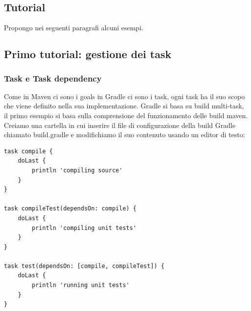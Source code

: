 \documentclass{article}
\begin{document}
\begin{flushleft}
\section{Tutorial} %
Propongo nei seguenti paragrafi alcuni esempi.

\subsection{Primo tutorial: gestione dei task}

\subsubsection{Task e Task dependency}
Come in Maven ci sono i goals in Gradle ci sono i task, ogni task ha il suo scopo che viene definito nella sua implementazione. Gradle si basa su build multi-task, il primo esempio si basa sulla comprensione del funzionamento delle build maven. Creiamo una cartella in cui inserire il file di configurazione della build Gradle chiamato build.gradle e modifichiamo il suo contenuto usando un editor di testo:
\begin{verbatim}
task compile {
    doLast {
        println 'compiling source'
    }
}

task compileTest(dependsOn: compile) {
    doLast {
        println 'compiling unit tests'
    }
}

task test(dependsOn: [compile, compileTest]) {
    doLast {
        println 'running unit tests'
    }
}


\end{verbatim}
\end{flushleft}
\end{document}
